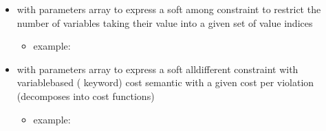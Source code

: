 \documentclass[letterpaper,10pt,openany,oneside,english]{sphinxmanual}
\begin{document}
\begin{itemize}
\begin{itemize}
\end{itemize}

\item {} 
\sphinxAtStartPar
{} with parameters array  to express a soft among constraint to restrict the number of variables taking their value into a given set of value indices
\begin{itemize}
\item {} 
\sphinxAtStartPar
example:

\begin{sphinxVerbatim}[commandchars=\\\{\}]
  \PYG{p}{[}   \PYG{p}{]}
         
        
            
            
           
           
           \PYG{p}{[}\PYG{p}{]}
\end{sphinxVerbatim}

\end{itemize}

\item {} 
\sphinxAtStartPar
{} with parameters array  to express a soft alldifferent constraint with variable\sphinxhyphen{}based ( keyword) cost semantic with a given cost per violation (decomposes into  cost functions)
\begin{itemize}
\item {} 
\sphinxAtStartPar
example:

\begin{sphinxVerbatim}[commandchars=\\\{\}]
  \PYG{p}{[}   \PYG{p}{]}
        
        
           
           
\end{sphinxVerbatim}


\end{itemize}
\end{itemize}
\end{document}
